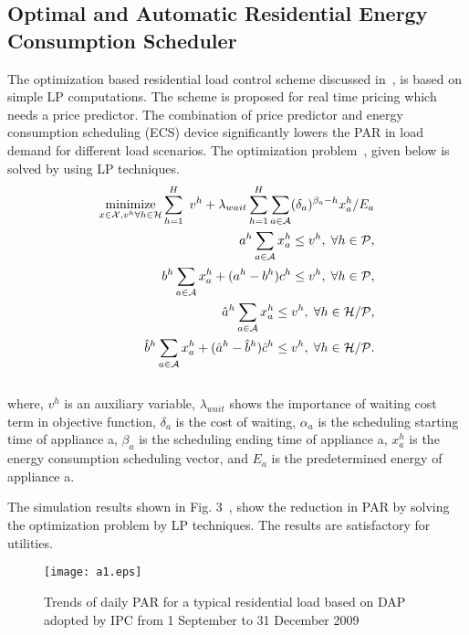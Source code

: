 \documentclass[journal]{IEEEtran}
\begin{document}
\subsection{Optimal and Automatic Residential Energy Consumption Scheduler}
 The optimization based residential load control scheme discussed in~\cite{mohsenian2010optimal}, is based on simple LP computations. The scheme is proposed for real time pricing which needs a price predictor. The combination of price predictor and energy consumption scheduling (ECS) device significantly lowers the PAR in load demand for different load scenarios. The optimization problem~\cite{mohsenian2010optimal}, given below is solved by using LP techniques.\\
\begin{equation}
\begin{split}
\underset{x\in \mathcal{X},v^h \forall h\in \mathcal{H}}{\text{minimize}}\sum_{h=1}^{H}\ v^{h}+\lambda_{wait}\sum_{h=1}^{H} \sum_{a\in \mathcal{A}} (\delta_{a})^{\beta_a-h} x_{a}^{h}/E_{a} \\
a^h\sum_{a\in \mathcal{A}}x_{a}^{h}\leq v^h ,\hspace{0.1cm}  \forall h\in \mathcal{P},\\
b^h\sum_{a\in \mathcal{A}}x_{a}^{h}+(a^h-b^h)c^h\leq v^h ,\hspace{0.1cm}  \forall h\in \mathcal{P},\\
\hat{a}^h\sum_{a\in \mathcal{A}}x_{a}^{h}\leq v^h ,\hspace{0.1cm}  \forall h\in \mathcal{H}/\mathcal{P},\\
\hat{b}^h\sum_{a\in \mathcal{A}}x_{a}^{h}+(\hat{a}^{h} - \hat{b}^{h})\hat{c}^{h}\leq v^h ,\hspace{0.1cm}  \forall h\in \mathcal{H}/\mathcal{P}.\\
\end{split}
\end{equation}\\
where, ${v^h}$ is an auxiliary variable, $\lambda_{wait}$ shows the importance of waiting cost term in objective function, $\delta_{a}$ is the cost of waiting, $\alpha_{a}$ is the scheduling starting time of appliance a, $\beta_{a}$ is the scheduling ending time of appliance a, $x_{a}^{h}$ is the energy consumption scheduling vector, and $E_{a}$ is the predetermined energy of appliance a.


The simulation results shown in Fig. 3~\cite{mohsenian2010optimal}, show the reduction in PAR by solving the optimization problem by LP techniques. The results are satisfactory for utilities.
\begin{figure}[!h]
\centering
\texttt{[image: a1.eps]}
\caption{Trends of daily PAR for a typical residential load based on DAP adopted by IPC from 1 September to 31 December 2009 }
\end{figure}\\
\end{document}
